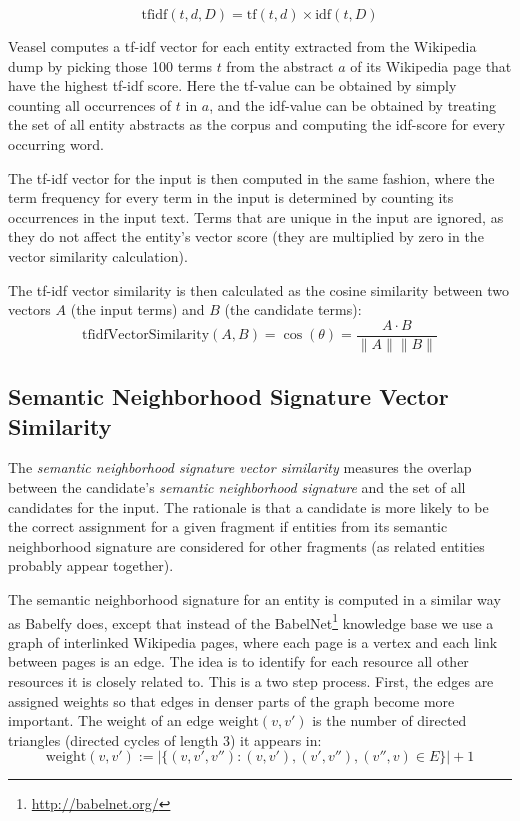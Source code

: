 \documentclass[runningheads,a4paper]{llncs}
\begin{document}
{$$ \mathrm{tfidf}(t, d, D) = \mathrm{tf}(t, d) \times \mathrm{idf}(t, D) $$

Veasel computes a tf-idf vector for each entity extracted from the Wikipedia dump by picking those 100 terms $t$ from the abstract $a$ of its Wikipedia page that have the highest tf-idf score. Here the tf-value can be obtained by simply counting all occurrences of $t$ in $a$, and the idf-value can be obtained by treating the set of all entity abstracts as the corpus and computing the idf-score for every occurring word. 

The tf-idf vector for the input is then computed in the same fashion, where the term frequency for every term in the input is determined by counting its occurrences in the input text. Terms that are unique in the input are ignored, as they do not affect the entity's vector score (they are multiplied by zero in the vector similarity calculation).

The tf-idf vector similarity is then calculated as the cosine similarity between two vectors $A$ (the input terms) and $B$ (the candidate terms):
$$\mathrm{tfidfVectorSimilarity}(A, B) = \cos(\theta) = \frac{A \cdot B}{\|A\| \|B\|}$$

\subsection{Semantic Neighborhood Signature Vector Similarity}

The \emph{semantic neighborhood signature vector similarity} measures the overlap between the candidate's \emph{semantic neighborhood signature} and the set of all candidates for the input. The rationale is that a candidate is more likely to be the correct assignment for a given fragment if entities from its semantic neighborhood signature are considered for other fragments (as related entities probably appear together).

The semantic neighborhood signature for an entity is computed in a similar way as Babelfy \cite{babelfy} does, except that instead of the BabelNet\footnote{\url{http://babelnet.org/}} knowledge base we use a graph of interlinked Wikipedia pages, where each page is a vertex and each link between pages is an edge. The idea is to identify for each resource all other resources it is closely related to. This is a two step process. First, the edges are assigned weights so that edges in denser parts of the graph become more important. The weight of an edge $\mathrm{weight}(v, v')$ is the number of directed triangles (directed cycles of length 3) it appears in:
$$\mathrm{weight}(v, v') := |\{(v, v', v'') : (v, v'), (v', v''), (v'', v) \in E\}| + 1$$

}
\end{document}
